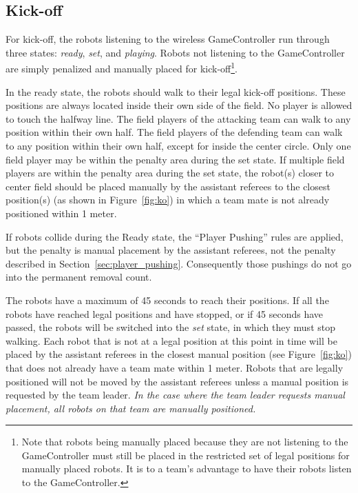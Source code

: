 \documentclass[12pt]{article}
\newcommand{\KickOffAutoTime}{45 seconds\xspace}
\begin{document}
\subsection{Kick-off}
\label{sec:kick-off}
For kick-off, the robots listening to the wireless GameController run through three states: \emph{ready}, \emph{set}, and \emph{playing}. Robots not listening to the GameController are simply penalized and manually placed for kick-off\footnote{Note that robots being manually placed because they are not listening to the GameController must still be placed in the restricted set of legal positions for manually placed robots. It is to a team's advantage to have their robots listen to the GameController.}.

In the ready state, the robots should walk to their legal kick-off positions. These positions are always located inside their own side of the field. No player is allowed to touch the halfway line.
The field players of the attacking team can walk to any position within their own half.
The field players of the defending team can walk to any position within their own half, except for inside the center circle.  Only one field player may be within the penalty area during the set state.  If multiple field players are within the penalty area during the set state, the robot(s) closer to center field should be placed manually by the assistant referees to the closest position(s) (as shown in Figure~\ref{fig:ko}) in which a team mate is not already positioned within 1 meter.

If robots collide during the Ready state, the ``Player Pushing'' rules are applied, but the penalty is manual placement by the assistant referees, not the penalty described in Section~\ref{sec:player_pushing}.
Consequently those pushings do not go into the permanent removal count.

The robots have a maximum of \KickOffAutoTime to reach their positions. If all the robots have reached legal positions and have stopped, or if \KickOffAutoTime have passed, the robots will be switched into the \emph{set} state, in which they must stop walking. Each robot that is not at a legal position at this point in time will be placed by the assistant referees in the closest manual position (see Figure~\ref{fig:ko}) that does not already have a team mate within 1 meter.
Robots that are legally positioned will not be moved by the assistant referees unless a manual position is requested by the team leader.
\emph{In the case where the team leader requests manual placement, all robots on that team are manually positioned.}
\end{document}
